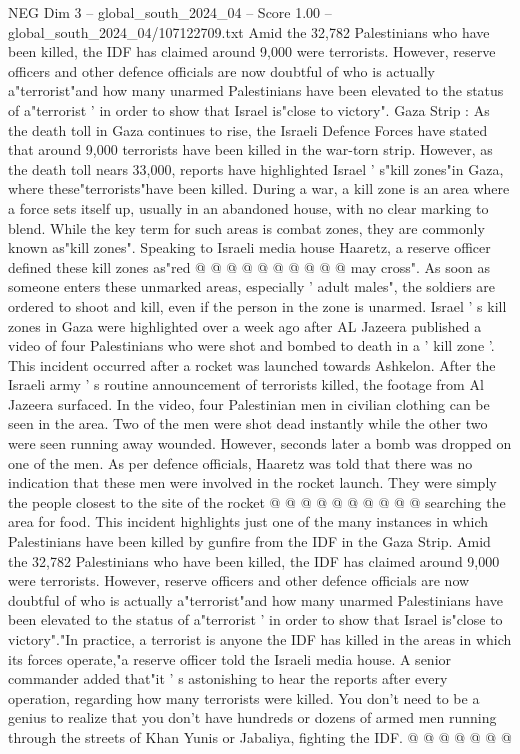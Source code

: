 \begin{textsample}{NEG Dim 3 – global\_south\_2024\_04 – Score 1.00 – global\_south\_2024\_04/107122709.txt}  \label{ex:f3_neg_262}
Amid the 32,782 Palestinians who have been killed, the IDF has claimed around 9,000 were terrorists.
However, reserve officers and other defence officials are now doubtful of who is actually a"terrorist"and how many unarmed Palestinians have been elevated to the status of a"terrorist ' in order to show that Israel is"close to victory".
Gaza Strip : As the death toll in Gaza continues to rise, the Israeli Defence Forces have stated that around 9,000 terrorists have been killed in the war-torn strip.
However, as the death toll nears 33,000, reports have highlighted Israel ' s"kill zones"in Gaza, where these"terrorists"have been killed.
During a war, a kill zone is an area where a force sets itself up, usually in an abandoned house, with no clear marking to blend.
While the key term for such areas is combat zones, they are commonly known as"kill zones".
Speaking to Israeli media house Haaretz, a reserve officer defined these kill zones as"red @ @ @ @ @ @ @ @ @ @ may cross".
As soon as someone enters these unmarked areas, especially ' adult males", the soldiers are ordered to shoot and kill, even if the person in the zone is unarmed.
Israel ' s kill zones in Gaza were highlighted over a week ago after AL Jazeera published a video of four Palestinians who were shot and bombed to death in a ' kill zone '.
This incident occurred after a rocket was launched towards Ashkelon.
After the Israeli army ' s routine announcement of terrorists killed, the footage from Al Jazeera surfaced.
In the video, four Palestinian men in civilian clothing can be seen in the area.
Two of the men were shot dead instantly while the other two were seen running away wounded.
However, seconds later a bomb was dropped on one of the men.
As per defence officials, Haaretz was told that there was no indication that these men were involved in the rocket launch.
They were simply the people closest to the site of the rocket @ @ @ @ @ @ @ @ @ @ searching the area for food.
This incident highlights just one of the many instances in which Palestinians have been killed by gunfire from the IDF in the Gaza Strip.
Amid the 32,782 Palestinians who have been killed, the IDF has claimed around 9,000 were terrorists.
However, reserve officers and other defence officials are now doubtful of who is actually a"terrorist"and how many unarmed Palestinians have been elevated to the status of a"terrorist ' in order to show that Israel is"close to victory"."In practice, a terrorist is anyone the IDF has killed in the areas in which its forces operate,"a reserve officer told the Israeli media house.
A senior commander added that"it ' s astonishing to hear the reports after every operation, regarding how many terrorists were killed.
You don't need to be a genius to realize that you don't have hundreds or dozens of armed men running through the streets of Khan Yunis or Jabaliya, fighting the IDF. @ @ @ @ @ @ @

\end{textsample}
